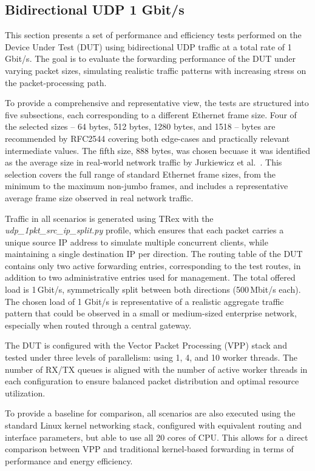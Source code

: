 \subsection{Bidirectional UDP 1 Gbit/s}
This section presents a set of performance and efficiency tests performed on the Device Under Test (DUT) using bidirectional UDP traffic at a total rate of 1\,Gbit/s. 
The goal is to evaluate the forwarding performance of the DUT under varying packet sizes, simulating realistic traffic patterns with increasing stress on the packet-processing path.

To provide a comprehensive and representative view, the tests are structured into five subsections, each corresponding to a different Ethernet frame size. 
Four of the selected sizes -- 64 bytes, 512 bytes, 1280 bytes, and 1518 -- bytes are recommended by RFC2544\cite{rfc2544} 
covering both edge-cases and practically relevant intermediate values. 
The fifth size, 888 bytes, was chosen becuase it was identified as the average size in real-world network traffic by Jurkiewicz et al.~\cite{JURKIEWICZ202115}. 
This selection covers the full range of standard Ethernet frame sizes, from the minimum to the maximum non-jumbo frames, 
and includes a representative average frame size observed in real network traffic.

Traffic in all scenarios is generated using TRex with the \textit{udp\_1pkt\_src\_ip\_split.py} profile, 
which ensures that each packet carries a unique source IP address to simulate multiple concurrent clients, while maintaining a single destination IP per direction. 
The routing table of the DUT contains only two active forwarding entries, corresponding to the test routes, in addition to two administrative entries used for management.
The total offered load is 1\,Gbit/s, symmetrically split between both directions (500\,Mbit/s each).
The chosen load of 1 Gbit/s is representative of a realistic aggregate traffic pattern that could be observed in a small or medium-sized enterprise network, especially when routed through a central gateway.

The DUT is configured with the Vector Packet Processing (VPP) stack and tested under three levels of parallelism: using 1, 4, and 10 worker threads. 
The number of RX/TX queues is aligned with the number of active worker threads in each configuration to ensure balanced packet distribution and optimal resource utilization.

To provide a baseline for comparison, all scenarios are also executed using the standard Linux kernel networking stack, 
configured with equivalent routing and interface parameters, but able to use all 20 cores of CPU. 
This allows for a direct comparison between VPP and traditional kernel-based forwarding in terms of performance and energy efficiency.

